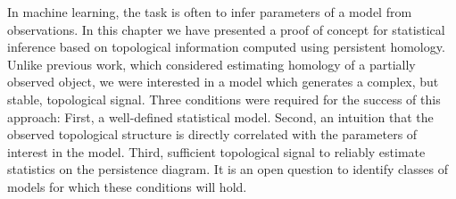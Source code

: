 In machine learning, the task is often to infer parameters of a model from observations.
In this chapter we have presented a proof of concept for statistical inference based on topological information computed using persistent homology.
Unlike previous work, which considered estimating homology of a partially observed object, we were interested in a model which generates a complex, but stable, topological signal.
Three conditions were required for the success of this approach:
First, a well-defined statistical model.
Second, an intuition that the observed topological structure is directly correlated with the parameters of interest in the model.
Third, sufficient topological signal to reliably estimate statistics on the persistence diagram.
It is an open question to identify classes of models for which these conditions will hold.
